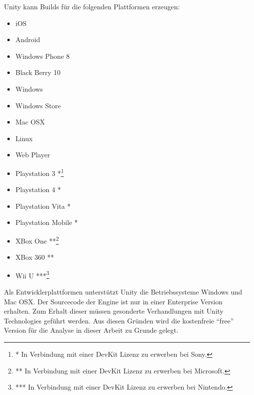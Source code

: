 \documentclass[pagesize, paper=a4, fontsize=12pt, titlepage=true, headings=small, headnosepline, abstractoff, liststotoc, nochapterprefix, plainheadsepline, twoside]{scrreprt}
\begin{document}
Unity kann Builds für die folgenden Plattformen erzeugen:
\begin{itemize}
\item iOS
\item Android
\item Windows Phone 8
\item Black Berry 10
\item Windows
\item Windows Store
\item Mac OSX
\item Linux
\item Web Player
\item Playstation 3 *\footnote{* In Verbindung mit einer DevKit Lizenz zu erwerben bei Sony.}
\item Playstation 4 *
\item Playstation Vita *
\item Playstation Mobile *
\item XBox One **\footnote{** In Verbindung mit einer DevKit Lizenz zu erwerben bei Microsoft.}
\item XBox 360 **
\item Wii U  ***\footnote{*** In Verbindung mit einer DevKit Lizenz zu erwerben bei Nintendo.}
\end{itemize}

Als Entwicklerplattformen unterstützt Unity die Betriebssysteme Windows und Mac OSX. Der Sourcecode der Engine ist nur in einer Enterprise Version erhalten. Zum Erhalt dieser müssen gesonderte Verhandlungen mit Unity Technologies geführt werden. Aus diesen Gründen wird die kostenfreie “free” Version für die Analyse in dieser Arbeit zu Grunde gelegt.
\end{document}
